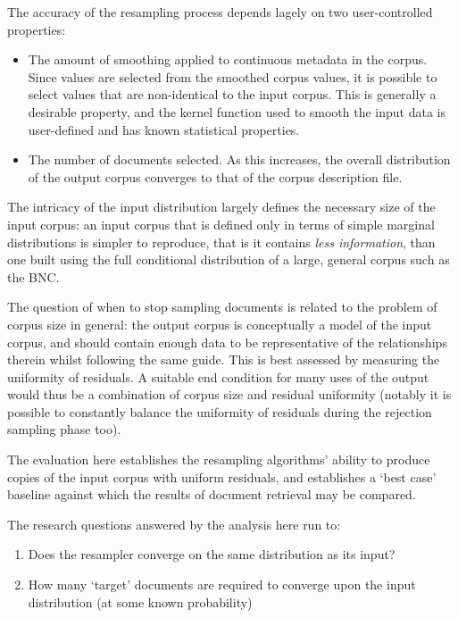 
The accuracy of the resampling process depends lagely on two user-controlled properties:

\begin{itemize}
    \item The amount of smoothing applied to continuous metadata in the corpus.  Since values are selected from the smoothed corpus values, it is possible to select values that are non-identical to the input corpus.  This is generally a desirable property, and the kernel function used to smooth the input data is user-defined and has known statistical properties.
    \item The number of documents selected.  As this increases, the overall distribution of the output corpus converges to that of the corpus description file.
\end{itemize}


The intricacy of the input distribution largely defines the necessary size of the input corpus: an input corpus that is defined only in terms of simple marginal distributions is simpler to reproduce, that is it contains \textit{less information}, than one built using the full conditional distribution of a large, general corpus such as the BNC.

The question of when to stop sampling documents is related to the problem of corpus size in general: the output corpus is conceptually a model of the input corpus, and should contain enough data to be representative of the relationships therein whilst following the same guide.  This is best assessed by measuring the uniformity of residuals.  A suitable end condition for many uses of the output would thus be a combination of corpus size and residual uniformity (notably it is possible to constantly balance the uniformity of residuals during the rejection sampling phase too).

The evaluation here establishes the resampling algorithms' ability to produce copies of the input corpus with uniform residuals, and establishes a `best case' baseline against which the results of document retrieval may be compared.

The research questions answered by the analysis here run to:

\begin{enumerate}
    \item Does the resampler converge on the same distribution as its input?
    \item How many `target' documents are required to converge upon the input distribution (at some known probability)
\end{enumerate}


